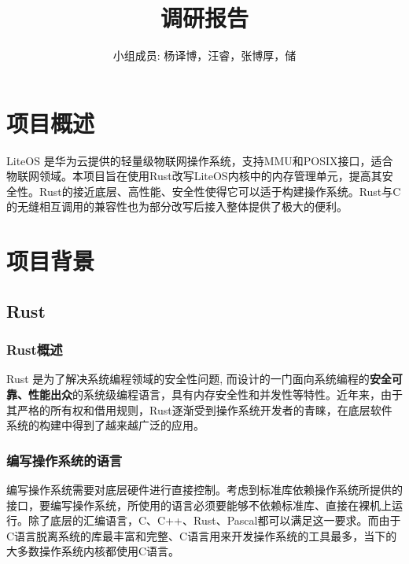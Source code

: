 \documentclass{article}
\title{\textbf{调研报告}}
\author{小组成员: 杨译博，汪睿，张博厚，储\SetFont{溦}}
\begin{document}
\maketitle
\newpage
\tableofcontents
\newpage
\section{项目概述}
LiteOS 是华为云提供的轻量级物联网操作系统，支持MMU和POSIX接口，适合物联网领域。本项目旨在使用Rust改写LiteOS内核中的内存管理单元，提高其安全性。Rust的接近底层、高性能、安全性使得它可以适于构建操作系统。Rust与C的无缝相互调用的兼容性也为部分改写后接入整体提供了极大的便利。
\section{项目背景}
\subsection{Rust}
\subsubsection{Rust概述}
Rust 是为了解决系统编程领域的安全性问题, 而设计的一门面向系统编程的\textbf{安全可靠、性能出众}的系统级编程语言，具有内存安全性和并发性等特性。近年来，由于其严格的所有权和借用规则，Rust逐渐受到操作系统开发者的青睐，在底层软件系统的构建中得到了越来越广泛的应用。
\subsubsection{编写操作系统的语言}
编写操作系统需要对底层硬件进行直接控制。考虑到标准库依赖操作系统所提供的接口，要编写操作系统，所使用的语言必须要能够不依赖标准库、直接在裸机上运行。除了底层的汇编语言，C、C++、Rust、Pascal都可以满足这一要求。而由于C语言脱离系统的库最丰富和完整、C语言用来开发操作系统的工具最多，当下的大多数操作系统内核都使用C语言。
\end{document}
